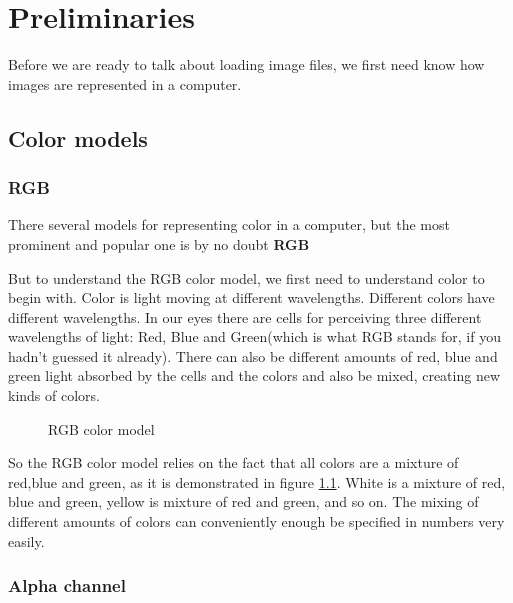 \begin{comment}
  
\end{comment}

\chapter{Preliminaries}
\label{cha:preliminaries}

Before we are ready to talk about loading image files, we first need
know how images are represented in a computer.

\section{Color models}
\label{sec:color-models}

\subsection{RGB}
\label{sec:rgb}

There several models for representing color in a computer, but the
most prominent and popular one is by no doubt \textbf{RGB} 

But to understand the RGB color model, we first need to understand
color to begin with. Color is light moving at different
wavelengths. Different colors have different wavelengths. In our eyes
there are cells for perceiving three different wavelengths of light:
Red, Blue and Green(which is what RGB stands for, if you hadn't guessed
it already). There can also be different amounts of red, blue
and green light absorbed by the cells and the colors and also be
mixed, creating new kinds of colors. \cite{neider93:_openg_progr_guide}

\begin{figure}[h]
  \centering
  
  \caption{RGB color model}
  \label{fig:rgb}
\end{figure}

So the RGB color model relies on the fact that all colors are a
mixture of red,blue and green, as it is demonstrated in figure
\ref{fig:rgb}. White is a mixture of red, blue and green, yellow is
mixture of red and green, and so on. The mixing of different amounts
of colors can conveniently enough be specified in numbers very
easily.

\subsection{Alpha channel}
\label{sec:alpha_chan}

